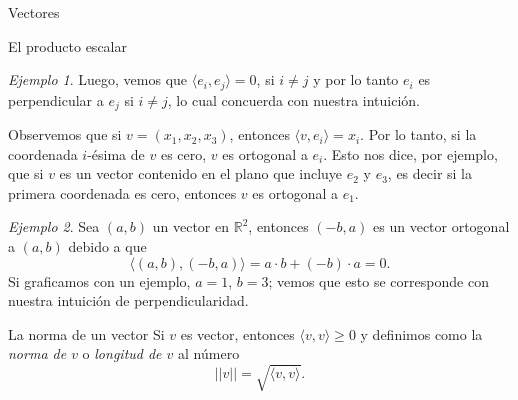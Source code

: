 \documentclass[a4paper,12pt,twoside,spanish,reqno]{amsbook}
\numberwithin{equation}{section}
\theoremstyle{definition}
\theoremstyle{remark}
\newtheorem*{ejemplo*}{Ejemplo}
\newcommand{\R}{\mathbb R}
\begin{document}
\begin{chapter}{Vectores}
\begin{section}{El producto escalar}
\begin{ejemplo*}
            Luego, vemos que $\langle e_i , e_j \rangle = 0$, si $i \ne j$ y por lo tanto $e_i$  es perpendicular a $e_j$ si $i \ne j$, lo cual concuerda con nuestra intuición. 
        \end{ejemplo*} 
            
            Observemos que si $v = (x_1,x_2,x_3)$,  entonces $\langle v , e_i \rangle = x_i$. Por lo tanto,  si la coordenada $i$-ésima de $v$ es cero,  $v$  es ortogonal a $e_i$. Esto nos dice,  por ejemplo,  que si $v$  es un vector contenido en el plano que incluye $e_2$ y $e_3$,  es decir si la primera coordenada es cero,  entonces $v$  es ortogonal a $e_1$. 
            
        
        \begin{ejemplo*} Sea $(a,b)$ un vector en $\R^2$, entonces $(-b,a)$ es un vector ortogonal a $(a,b)$ debido a que
            \begin{equation*}
                \langle (a,b) , (-b,a) \rangle = a\cdot b + (-b) \cdot a = 0.
            \end{equation*}
            Si graficamos con un ejemplo, $a=1$, $b=3$; vemos que esto se corresponde con nuestra intuición de perpendicularidad. 
                
            \begin{center}
            \end{center}	
                
        \end{ejemplo*}
        
        
    \end{section}

    \begin{section}{La norma de un vector}\label{secccion-norma-de-un-vector}
    Si $v$  es vector,  entonces $\langle v , v \rangle \ge 0$ y definimos como la \textit{norma de $v$} o \textit{longitud de $v$} al número
    \begin{equation*}
        ||v|| = \sqrt{\langle v , v \rangle}.
    \end{equation*}
    

\end{section}
\end{chapter}
\end{document}
